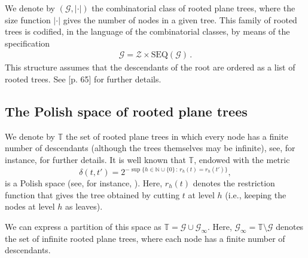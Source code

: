 \documentclass[11pt,a4paper,leqno]{amsart}
\theoremstyle{plain}
\theoremstyle{definition}
\numberwithin{equation}{section}
\begin{document}
	We denote by \( (\mathcal{G}, |\cdot|) \) the combinatorial class of rooted plane trees, where the size function \( |\cdot| \) gives the number of nodes in a given tree. This family of rooted trees is codified, in the language of the combinatorial classes, by means of the specification
	\begin{align*}
		\mathcal{G} = \mathcal{Z} \times \text{SEQ}(\mathcal{G})\,.
	\end{align*}
	This structure assumes that the descendants of the root are ordered as a list of rooted trees. See \cite{Flajolet} [p. 65] for further details.
	
	\subsection{The Polish space of rooted plane trees} We denote by \(\mathbb{T}\) the set of rooted plane trees in which every node has a finite number of descendants (although the trees themselves may be infinite), see, for instance, \cite{Kesten} for further details. It is well known that $\mathbb{T}$, endowed with the metric
$$
	\delta(t,t') = 2^{-\sup\{h \in \mathbb{N} \cup \{0\}\, : \, r_h(t) = r_h(t')\}},
$$
	is a Polish space (see, for instance, \cite{Kesten}). Here, \(r_h(t)\) denotes the restriction function that gives the tree obtained by cutting \(t\) at level \(h\) (i.e., keeping the nodes at level \(h\) as leaves).
	\smallskip
	
	We can express a partition of this space as \( \mathbb{T} = \mathcal{G} \cup \mathcal{G}_{\infty} \). Here, \( \mathcal{G}_{\infty} = \mathbb{T} \setminus \mathcal{G} \) denotes the set of infinite rooted plane trees, where each node has a finite number of descendants.
	
\end{document}
